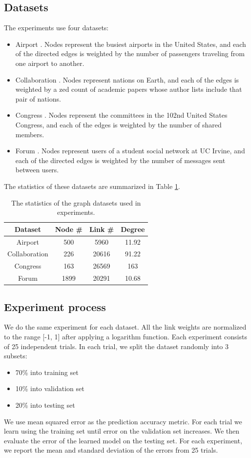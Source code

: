 \documentclass[11pt,twocolumn]{article}
\begin{document}
\subsection{Datasets}
The experiments use four datasets:
\begin{itemize}
	\item Airport \cite{colizza2007reaction}. Nodes represent the busiest airports in the United States, and each of the directed edges is weighted by the number of passengers traveling from one airport to another.
	\item Collaboration \cite{pan2012world}. Nodes represent nations on Earth, and each of the edges	is weighted by a zed count of academic papers whose author lists include that pair of nations.
	\item Congress \cite{porter2005network}. Nodes represent the committees in the 102nd United States Congress, and each of the edges is weighted by the number of shared members.
	\item Forum \cite{opsahl2009clustering}. Nodes represent users of a student social network at UC Irvine, and each of the directed edges is weighted by the number of messages sent between users.
\end{itemize}
The statistics of these datasets are summarized in Table \ref{tab:datasets}.
\begin{table}[!ht]\centering
	\caption{The statistics of the graph datasets used in experiments.}
	\begin{tabular}{cccc} \hline \rowcolor{blue!30}
		Dataset & Node \# & Link \# & Degree \\ \hline
		Airport & 500 & 5960 & 11.92 \\ \hline
		Collaboration & 226 & 20616 & 91.22 \\ \hline
		Congress & 163 & 26569 & 163 \\ \hline
		Forum  & 1899 & 20291 & 10.68 \\ \hline
	\end{tabular}
	\label{tab:datasets}
\end{table}

\subsection{Experiment process}
We do the same experiment for each dataset.
All the link weights are normalized to the range [-1, 1] after applying a logarithm function.
Each experiment consists of 25 independent trials.
In each trial, we split the dataset randomly into 3 subsets:
\begin{itemize}
	\item 70\% into training set
	\item 10\% into validation set
	\item 20\% into testing set
\end{itemize}
We use mean squared error as the prediction accuracy metric.
For each trial we learn using the training set until error on the validation set increases. We then evaluate the error of the learned model on the testing set.
For each experiment, we report the mean and standard deviation of the errors from 25 trials.
\end{document}
